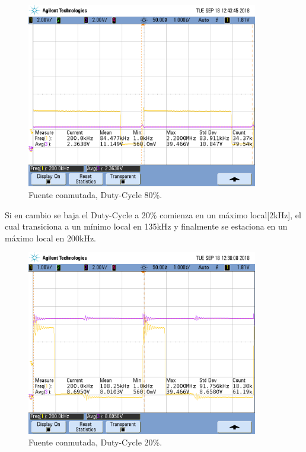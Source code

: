 \begin{figure}[H]
	\centering
	\includegraphics[width=0.9\textwidth]{Imagenes/dc_84.png}
\caption{Fuente conmutada, Duty-Cycle 80\%.}
	\label{fig:fcon}
\end{figure}
Si en cambio se baja el Duty-Cycle a 20\% comienza en un máximo local[2kHz], el cual transiciona a un mínimo local en 135kHz y finalmente se estaciona en un máximo local en 200kHz.
\begin{figure}[H]
	\centering
	\includegraphics[width=0.9\textwidth]{Imagenes/dc_20.png}
\caption{Fuente conmutada, Duty-Cycle 20\%.}
	\label{fig:fcon}
\end{figure}
